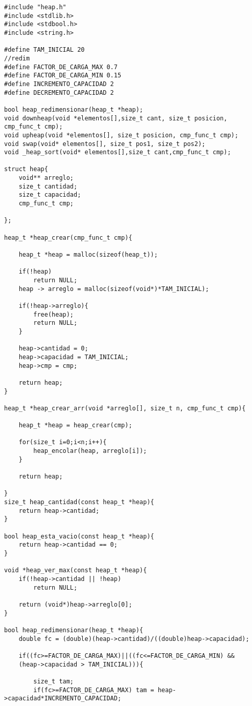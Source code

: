 \documentclass[11pt,a4paper]{article}
\begin{document}
\begin{lstlisting}[style= c]
#include "heap.h"
#include <stdlib.h>
#include <stdbool.h>
#include <string.h>

#define TAM_INICIAL 20
//redim
#define FACTOR_DE_CARGA_MAX 0.7
#define FACTOR_DE_CARGA_MIN 0.15
#define INCREMENTO_CAPACIDAD 2
#define DECREMENTO_CAPACIDAD 2

bool heap_redimensionar(heap_t *heap);
void downheap(void *elementos[],size_t cant, size_t posicion, cmp_func_t cmp);
void upheap(void *elementos[], size_t posicion, cmp_func_t cmp);
void swap(void* elementos[], size_t pos1, size_t pos2);
void _heap_sort(void* elementos[],size_t cant,cmp_func_t cmp);

struct heap{
	void** arreglo;
	size_t cantidad;
	size_t capacidad;
	cmp_func_t cmp;

};

heap_t *heap_crear(cmp_func_t cmp){
	
	heap_t *heap = malloc(sizeof(heap_t));
	
	if(!heap)
		return NULL;
	heap -> arreglo = malloc(sizeof(void*)*TAM_INICIAL);

	if(!heap->arreglo){
		free(heap);
		return NULL;
	}

	heap->cantidad = 0;
	heap->capacidad = TAM_INICIAL;
	heap->cmp = cmp;

	return heap;
}

heap_t *heap_crear_arr(void *arreglo[], size_t n, cmp_func_t cmp){
	
	heap_t *heap = heap_crear(cmp);
	
	for(size_t i=0;i<n;i++){	
		heap_encolar(heap, arreglo[i]);
	}
		
	return heap;

}
size_t heap_cantidad(const heap_t *heap){
	return heap->cantidad;
}

bool heap_esta_vacio(const heap_t *heap){
	return heap->cantidad == 0;
}

void *heap_ver_max(const heap_t *heap){
	if(!heap->cantidad || !heap)
		return NULL;

	return (void*)heap->arreglo[0];
}

bool heap_redimensionar(heap_t *heap){
	double fc = (double)(heap->cantidad)/((double)heap->capacidad);

	if((fc>=FACTOR_DE_CARGA_MAX)||((fc<=FACTOR_DE_CARGA_MIN) && 
    (heap->capacidad > TAM_INICIAL))){

		size_t tam;
		if(fc>=FACTOR_DE_CARGA_MAX) tam = heap->capacidad*INCREMENTO_CAPACIDAD;


\end{lstlisting}
\end{document}
